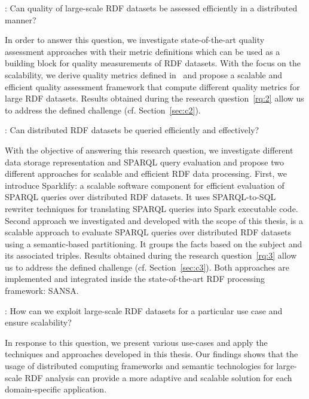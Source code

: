 \begin{tcolorbox}
\textbf{\rqNr[RQ2]\label{rq:2}}: Can quality of large-scale \gls{RDF} datasets be assessed efficiently in a distributed manner?
\end{tcolorbox}

In order to answer this question, we investigate state-of-the-art quality assessment approaches with their metric definitions which can be used as a building block for quality measurements of \gls{RDF} datasets.
With the focus on the scalability, we derive quality metrics defined in~\cite{zaveri2015quality} and propose a scalable and efficient quality assessment framework that compute different quality metrics for large \gls{RDF} datasets.
Results obtained during the research question~\ref{rq:2} allow us to address the defined challenge (cf. Section~\ref{sec:c2}).

\begin{tcolorbox}
\textbf{\rqNr[RQ3]\label{rq:3}}: Can distributed \gls{RDF} datasets be queried efficiently and effectively?
\end{tcolorbox}

With the objective of answering this research question, we investigate different data storage representation and \gls{SPARQL} query evaluation and propose two different approaches for scalable and efficient \gls{RDF} data processing.
First, we introduce Sparklify: a scalable software component for efficient evaluation of \gls{SPARQL} queries over distributed \gls{RDF} datasets.
It uses SPARQL-to-SQL rewriter techniques for translating \gls{SPARQL} queries into Spark executable code.
Second approach we investigated and developed with the scope of this thesis, is a scalable approach to evaluate \gls{SPARQL} queries over distributed \gls{RDF} datasets using a semantic-based partitioning.
It groups the facts based on the subject and its associated triples.
Results obtained during the research question~\ref{rq:3} allow us to address the defined challenge (cf. Section~\ref{sec:c3}). 
Both approaches are implemented and integrated inside the state-of-the-art \gls{RDF} processing framework: SANSA.

\begin{tcolorbox}
\textbf{\rqNr[RQ4]\label{rq:4}}: How can we exploit large-scale \gls{RDF} datasets for a particular use case and ensure scalability?
\end{tcolorbox}

In response to this question, we present various use-cases and apply the techniques and approaches developed in this thesis.
Our findings shows that the usage of distributed computing frameworks and semantic technologies for large-scale \gls{RDF} analysis can provide a more adaptive and scalable solution for each domain-specific application.

